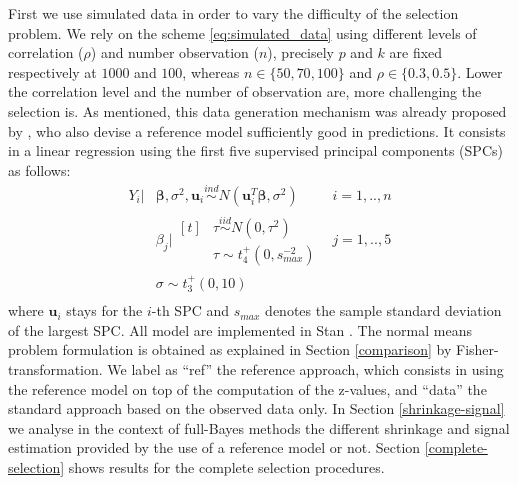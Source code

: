 \documentclass[american,]{article}
\theoremstyle{definition}
\begin{document}
First we use simulated data in order to vary the difficulty of the selection problem. We rely on the scheme \eqref{eq:simulated_data} using different levels of correlation ($\rho$) and number observation ($n$), precisely $p$ and $k$ are fixed respectively at $1000$ and $100$, whereas $n\in\{50,70,100\}$ and $\rho\in\{0.3,0.5\}$. Lower the correlation level and the number of observation are, more challenging the selection is. As mentioned, this data generation mechanism was already proposed by \cite{paper:projpred}, who also devise a reference model sufficiently good in predictions. It consists in a linear regression using the first five supervised principal components (SPCs) \citep{paper:original_spc, paper:piironen_spc} as follows:
\
\begin{equation}
\label{eq:ref_mod}
\begin{aligned}
    Y_{i}|&\boldsymbol{\beta},\sigma^{2},\boldsymbol{u}_{i} \overset{ind}{\sim} N(\boldsymbol{u}_{i}^{T}\boldsymbol{\beta},\sigma^{2}) \quad &i=1,..,n \\
    &\beta_{j}|\!\begin{aligned}[t] &\tau \overset{iid}{\sim} N(0,\tau^{2})\\
    &\tau \sim t_{4}^{+}(0,s_{max}^{-2}) 
    \end{aligned} &j=1,..,5 \\ 
    &\sigma \sim t_{3}^{+}(0,10) \\
\end{aligned}
\end{equation}
where $\boldsymbol{u}_{i}$ stays for the $i$-th SPC and $s_{max}$ denotes the sample standard deviation of the largest SPC. All model are implemented in Stan \citep{paper:stan}. The normal means problem formulation is obtained as explained in Section \ref{comparison} by Fisher-transformation. We label as ``ref'' the reference approach, which consists in using the reference model on top of the computation of the z-values, and ``data'' the standard approach based on the observed data only. In Section \ref{shrinkage-signal} we analyse in the context of full-Bayes methods the different shrinkage and signal estimation provided by the use of a reference model or not. Section \ref{complete-selection} shows results for the complete selection procedures.
\end{document}
